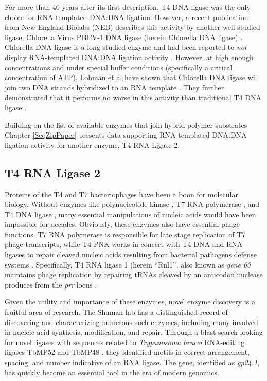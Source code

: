     For more than 40 years after its first description, T4 DNA ligase was the only choice for RNA-templated DNA:DNA ligation. However, a recent publication from New England Biolabs (NEB) describes this activity by another well-studied ligase, Chlorella Virus PBCV-1 DNA ligase (herein Chlorella DNA ligase) \citep{Lohman2013c}. Chlorella DNA ligase is a long-studied enzyme and had been reported to \textit{not} display RNA-templated DNA:DNA ligation activity \citep{Ho1997b,Sriskanda1998c}. However, at high enough concentrations and under special buffer conditions (specifically a critical concentration of ATP), Lohman et al have shown that Chlorella DNA ligase will join two DNA strands hybridized to an RNA template \citep{Lohman2013c}. They further demonstrated that it performs no worse in this activity than traditional T4 DNA ligase \citep{Nilsson2001,Yeakley2002}.

    Building on the list of available enzymes that join hybrid polymer substrates Chapter \ref{SeqZipPaper} presents data supporting RNA-templated DNA:DNA ligation activity for another enzyme, T4 RNA Ligase 2.

  \subsection{T4 RNA Ligase 2}
    \label{Intro:subsec:Rnl2}

    Proteins of the T4 and T7 bacteriophages have been a boon for molecular biology. Without enzymes like polynucleotide kinase \citep{Richardson1965a}, T7 RNA polymerase \citep{Summers1970b}, and T4 DNA ligase \citep{Weiss1967a}, many essential manipulations of nucleic acids would have been impossible for decades. Obviously, these enzymes also have essential phage functions. T7 RNA polymerase is responsible for late stage replication of T7 phage transcripts, while T4 PNK works in concert with T4 DNA and RNA ligases to repair cleaved  nucleic acids resulting from bacterial pathogens defense systems \citep{Wang2002b}. Specifically, T4 RNA ligase 1 (herein ``Rnl1'', also known as \textit{gene 63} maintains phage replication by repairing tRNAs cleaved by an anticodon nuclease produces from the \textit{prr} locus \citep{Amitsur1987d}.

    Given the utility and importance of these enzymes, novel enzyme discovery is a fruitful area of research. The Shuman lab has a distinguished record of discovering and characterizing numerous such enzymes, including many involved in nucleic acid synthesis, modification, and repair. Through a blast search looking for novel ligases with sequences related to \textit{Trypanosoma brucei} RNA-editing ligases TbMP52 and TbMP48 \citep{Ho2002b}, they identified motifs in correct arrangement, spacing, and number indicative of an RNA ligase. The gene, identified as \textit{gp24.1}, has quickly become an essential tool in the era of modern genomics.

